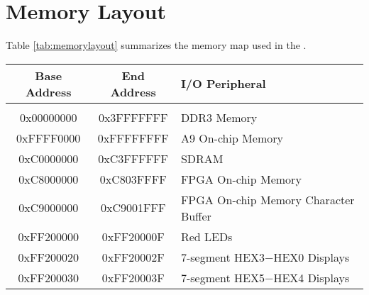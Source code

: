 

\newpage
\section{Memory Layout}
\label{sec:mm}

\noindent
Table \ref{tab:memorylayout} summarizes the memory map used in the \systemName.
~\\

\begin{table}[h]
    \begin{center}
    \begin{tabular}{c|c|l}
            \textbf{Base Address}
            & \textbf{End Address}
            & \textbf{I/O Peripheral}
				\\\hline\vspace{-3mm}\\
            0x00000000
            & 0x3FFFFFFF
            & DDR3 Memory
        \\
            0xFFFF0000
            & 0xFFFFFFFF
            & A9 On-chip Memory
        \\
            0xC0000000
            & 0xC3FFFFFF
            & SDRAM
        \\
            0xC8000000
            & 0xC803FFFF
            & FPGA On-chip Memory
        \\
            0xC9000000
            & 0xC9001FFF
            & FPGA On-chip Memory Character Buffer
        \\
            0xFF200000
            & 0xFF20000F
            & Red LEDs
        \\
            0xFF200020
            & 0xFF20002F
            & 7-segment HEX3$-$HEX0 Displays
        \\
            0xFF200030
            & 0xFF20003F
            & 7-segment HEX5$-$HEX4 Displays


\end{tabular}
\end{center}
\end{table}
